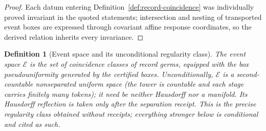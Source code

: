 \documentclass[11pt]{article}
\newtheorem{definition}[theorem]{Definition}
\begin{document}
\begin{proof}
Each datum entering Definition~\ref{def:record-coincidence} was individually
proved invariant in the quoted statements; intersection and nesting of
transported event boxes are expressed through covariant affine response
coordinates, so the derived relation
inherits every invariance.
\end{proof}

\begin{definition}[Event space and its unconditional regularity class]
\label{def:event-space}
The \emph{event space} \(\mathcal E\) is the set of coincidence classes of
record germs, equipped with the box pseudouniformity generated by the
certified boxes. Unconditionally, \(\mathcal E\) is a second-countable
nonseparated uniform space (the tower is countable and each stage carries
finitely many tokens); it need be neither Hausdorff nor a manifold. Its
Hausdorff reflection is taken only after the separation receipt. This is the precise
regularity class obtained without receipts; everything stronger below is
conditional and cited as such.
\end{definition}
\end{document}
